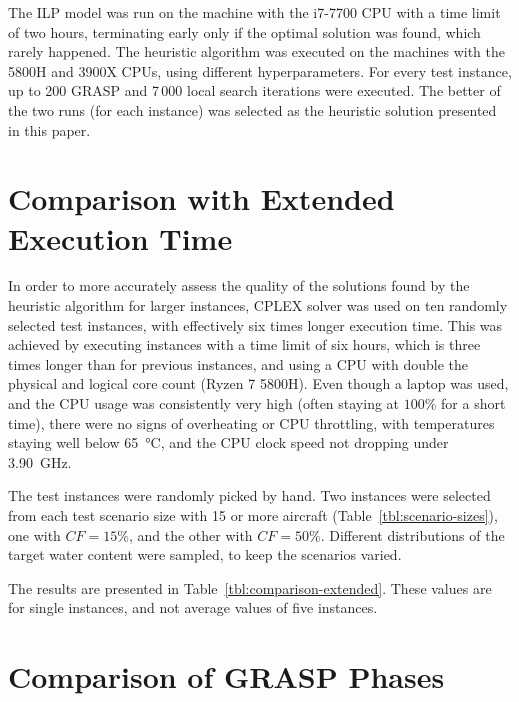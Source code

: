 The ILP model was run on the machine with the i7-7700 CPU with a time limit of two hours, terminating early only if the optimal solution was found, which rarely happened.
The heuristic algorithm was executed on the machines with the 5800H and 3900X CPUs, using different hyperparameters.
For every test instance, up to 200 GRASP and 7\,000 local search iterations were executed.
The better of the two runs (for each instance) was selected as the heuristic solution presented in this paper.






\section{Comparison with Extended Execution Time}

In order to more accurately assess the quality of the solutions found by the heuristic algorithm for larger instances, CPLEX solver was used on ten randomly selected test instances, with effectively six times longer execution time.
This was achieved by executing instances with a time limit of six hours, which is three times longer than for previous instances, and using a CPU with double the physical and logical core count (Ryzen 7 5800H).
Even though a laptop was used, and the CPU usage was consistently very high (often staying at $100\%$ for a short time), there were no signs of overheating or CPU throttling, with temperatures staying well below \SI{65}{\degreeCelsius}, and the CPU clock speed not dropping under 3.90~GHz.

The test instances were randomly picked by hand.
Two instances were selected from each test scenario size with 15 or more aircraft (Table~\ref{tbl:scenario-sizes}), one with $\mathit{CF} = 15\%$, and the other with $\mathit{CF} = 50\%$.
Different distributions of the target water content were sampled, to keep the scenarios varied.

The results are presented in Table~\ref{tbl:comparison-extended}.
These values are for single instances, and not average values of five instances.




\section{Comparison of GRASP Phases}

